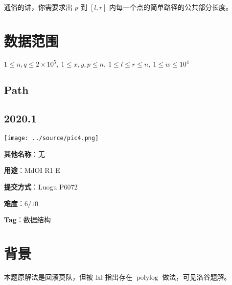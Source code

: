 \documentclass[a4paper,10pt]{article}
\begin{document}
通俗的讲，你需要求出 $p$ 到 $[l,r]$ 内每一个点的简单路径的公共部分长度。

\section*{数据范围}

$1\leq n,q\leq 2\times 10^5,\ 1\leq x,y,p\leq n,\ 1\leq l\leq r\leq n,\ 1\leq w\leq 10^4$

\newpage

\vspace*{\fill}
\begin{center}

\section{Path}

\subsection*{2020.1}

\vspace{10pt}

\texttt{[image: ../source/pic4.png]}

\vspace{10pt}

\textbf{其他名称}：无

\vspace{10pt}

\textbf{用途}：MdOI R1 E

\vspace{10pt}

\textbf{提交方式}：Luogu P6072

\vspace{10pt}

\textbf{难度}：$6/10$

\vspace{10pt}

\textbf{Tag}：数据结构

\end{center}
\vspace*{\fill}

\newpage

\section*{背景}

本题原解法是回滚莫队，但被 lxl 指出存在 $\operatorname{polylog}$ 做法，可见洛谷题解。
\end{document}
